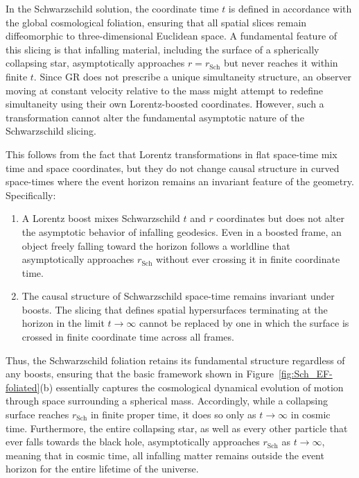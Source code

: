\documentclass[12pt]{book}
\begin{document}
In the Schwarzschild solution, the coordinate time $t$ is defined in accordance with the global cosmological foliation, ensuring that all spatial slices remain diffeomorphic to three-dimensional Euclidean space. A fundamental feature of this slicing is that infalling material, including the surface of a spherically collapsing star, asymptotically approaches $r = r_{\mathrm{Sch}}$ but never reaches it within finite $t$. Since GR does not prescribe a unique simultaneity structure, an observer moving at constant velocity relative to the mass might attempt to redefine simultaneity using their own Lorentz-boosted coordinates. However, such a transformation cannot alter the fundamental asymptotic nature of the Schwarzschild slicing.

This follows from the fact that Lorentz transformations in flat space-time mix time and space coordinates, but they do not change causal structure in curved space-times where the event horizon remains an invariant feature of the geometry. Specifically:
\begin{enumerate} 
    \item A Lorentz boost mixes Schwarzschild $t$ and $r$ coordinates but does not alter the asymptotic behavior of infalling geodesics. Even in a boosted frame, an object freely falling toward the horizon follows a worldline that asymptotically approaches $r_{\mathrm{Sch}}$ without ever crossing it in finite coordinate time. 
    \item The causal structure of Schwarzschild space-time remains invariant under boosts. The slicing that defines spatial hypersurfaces terminating at the horizon in the limit $t \to \infty$ cannot be replaced by one in which the surface is crossed in finite coordinate time across all frames. 
\end{enumerate}

Thus, the Schwarzschild foliation retains its fundamental structure regardless of any boosts, ensuring that the basic framework shown in Figure~\ref{fig:Sch_EF-foliated}(b) essentially captures the cosmological dynamical evolution of motion through space surrounding a spherical mass. Accordingly, while a collapsing surface reaches $r_{\mathrm{Sch}}$ in finite proper time, it does so only as $t \to \infty$ in cosmic time. Furthermore, the entire collapsing star, as well as every other particle that ever falls towards the black hole, asymptotically approaches 
$r_{\mathrm{Sch}}$ as $t\rightarrow\infty$, meaning that in cosmic time, all infalling matter remains outside the event horizon for the entire lifetime of the universe.
\end{document}
